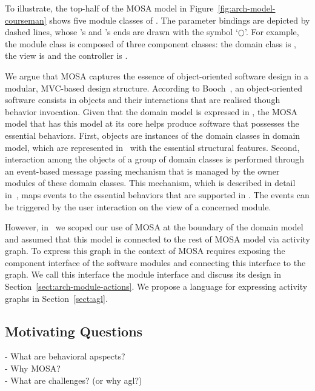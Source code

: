 %
To illustrate, the top-half of the MOSA model in Figure~\ref{fig:arch-model-courseman} shows five module classes of \courseman. The parameter bindings are depicted by dashed lines, whose 's and 's ends are drawn with the symbol `$\bigcirc$'. 
%
For example, the module class  is composed of three component classes: the domain class is , the view is  and the controller is .

We argue that MOSA captures the essence of object-oriented software design in a modular, MVC-based design structure. According to Booch~\cite{booch_object-oriented_1986}, an object-oriented software consists in objects and their interactions that are realised though behavior invocation. Given that the domain model is expressed in \dcsl, the MOSA model that has this model at its core helps produce software that possesses the essential behaviors. First, objects are instances of the domain classes in domain model, which are represented in \dcsl~with the essential structural features. Second, interaction among the objects of a group of domain classes is performed through an event-based message passing mechanism that is managed by the owner modules of these domain classes. This mechanism, which is described in detail in~\cite{le_jdomainapp_2017}, maps events to the essential behaviors that are supported in \dcsl. The events can be triggered by the user interaction on the view of a concerned module. 

However, in~\cite{le_domain_2018} we scoped our use of MOSA at the boundary of the domain model and assumed that this model is connected to the rest of MOSA model via activity graph. To express this graph in the context of MOSA requires exposing the component interface of the software modules and connecting this interface to the graph. We call this interface the module interface and discuss its design in Section~\ref{sect:arch-module-actions}. We propose a language for expressing activity graphs in Section~\ref{sect:agl}.

\subsection{Motivating Questions}

- What are behavioral apspects?\\
- Why MOSA?\\
- What are challenges? (or why agl?)


